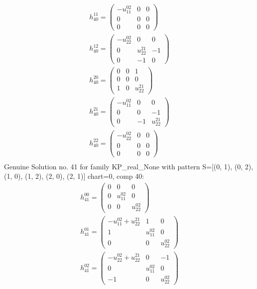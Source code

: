 \documentclass[a4paper, 11pt, twoside, onecolumn]{article}
\begin{document}
\begin{landscape}
\begin{gather*}
	 h_{40}^{11}=\begin{pmatrix}- u^{02}_{11} & 0 & 0\\0 & 0 & 0\\0 & 0 & 0\end{pmatrix}\\ 
	 h_{40}^{12}=\begin{pmatrix}- u^{02}_{22} & 0 & 0\\0 & u^{21}_{22} & -1\\0 & -1 & 0\end{pmatrix}\\ 
	 h_{40}^{20}=\begin{pmatrix}0 & 0 & 1\\0 & 0 & 0\\1 & 0 & u^{21}_{22}\end{pmatrix}\\ 
	 h_{40}^{21}=\begin{pmatrix}- u^{02}_{11} & 0 & 0\\0 & 0 & -1\\0 & -1 & u^{21}_{22}\end{pmatrix}\\ 
	 h_{40}^{22}=\begin{pmatrix}- u^{02}_{22} & 0 & 0\\0 & 0 & 0\\0 & 0 & 0\end{pmatrix}\\ 
\end{gather*} 
Genuine Solution no. 41 for family KP_real_None with pattern S=[(0, 1), (0, 2), (1, 0), (1, 2), (2, 0), (2, 1)] chart=0, comp 40: 
\begin{gather*} 
	 h_{41}^{00}=\begin{pmatrix}0 & 0 & 0\\0 & u^{02}_{11} & 0\\0 & 0 & u^{02}_{22}\end{pmatrix}\\ 
	 h_{41}^{01}=\begin{pmatrix}- u^{02}_{11} + u^{21}_{22} & 1 & 0\\1 & u^{02}_{11} & 0\\0 & 0 & u^{02}_{22}\end{pmatrix}\\ 
	 h_{41}^{02}=\begin{pmatrix}- u^{02}_{22} + u^{21}_{22} & 0 & -1\\0 & u^{02}_{11} & 0\\-1 & 0 & u^{02}_{22}\end{pmatrix}\\ 

\end{gather*}
\end{landscape}
\end{document}
